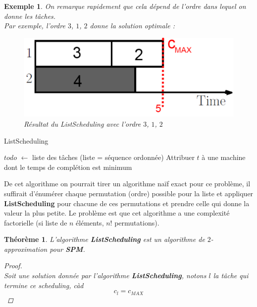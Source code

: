 \documentclass{article}
\newcommand{\titre}[1]{\textcolor{title}{#1}}
\newtheorem{exemple}{Exemple}[section]
\newtheorem{thm}{Th\'eor\`eme}[section]
\newtheorem{proof}{Preuve}[section]
\begin{document}
\begin{sffamily}
\begin{exemple}
On remarque rapidement que cela dépend de l'ordre dans lequel on donne les tâches.  \\ Par exemple, l'ordre $3$, $1$, $2$ donne la solution
optimale :

\begin{figure}[h!]
    \begin{center}
    \includegraphics[scale=0.3]{spm6.pdf}
    \caption{Résultat du ListScheduling avec l'ordre $3$, $1$, $2$}
    \end{center}
\end{figure}

\end{exemple}

\begin{algorithm}[h!]
\caption{ListScheduling}
\begin{algorithmic}[1]
\STATE $todo$ $\leftarrow$ liste des tâches (liste = séquence ordonnée)
\STATE Attribuer $t$ à une machine dont le temps de complétion est minimum
\ENDFOR
\end{algorithmic}
\end{algorithm}

De cet algorithme on pourrait tirer un algorithme naïf exact pour ce problème, il suffirait d'énumérer chaque permutation (ordre) possible
pour la liste et appliquer \textbf{ListScheduling} pour chacune de ces permutations et prendre celle qui donne la valeur la plus petite. Le
problème est que cet algorithme a une complexité factorielle (si liste de $n$ éléments, $n!$ permutations).

\newpage

\begin{thm} L'algorithme \textbf{ListScheduling} est un algorithme de $2$-approximation pour \textbf{\titre{SPM}}.
\begin{proof}$ $\\
Soit une solution donnée par l'algorithme \textbf{ListScheduling}, notons $l$ la tâche qui termine ce scheduling, càd $$c_l = c_{MAX}$$


\end{proof}
\end{thm}
\end{sffamily}
\end{document}
